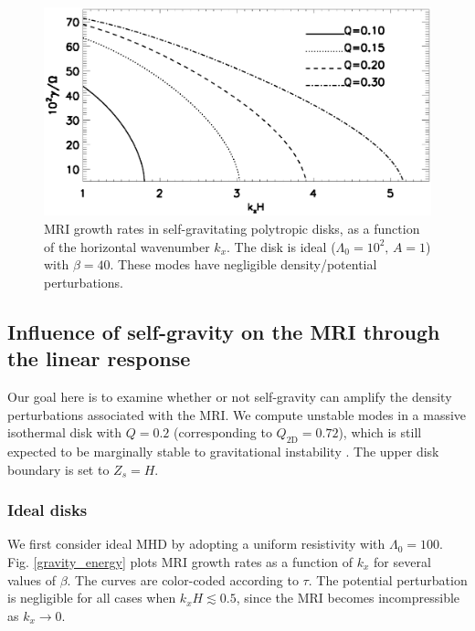  
\begin{figure}
  \includegraphics[width=\linewidth]{figures/compare_growth_poly_varQ_kx}
  \caption{MRI growth rates in self-gravitating polytropic disks, as a
    function of the horizontal wavenumber $k_x$. The disk is ideal
    ($\Lambda_0=10^2,\, A=1$) with $\beta = 40$. These modes have negligible
    density/potential perturbations.  
    \label{compare_growth_poly_kx}}
\end{figure}



\subsection{Influence of self-gravity on the MRI through the linear
  response}  
Our goal here is to examine whether or not self-gravity can amplify
the density perturbations associated with the MRI. We compute unstable modes
in a massive isothermal disk with $Q=0.2$ (corresponding to
$Q_\mathrm{2D}=0.72$), which is still expected to be marginally  
stable to gravitational instability \citep[][who find
a critical value of  $Q\simeq 0.2$]{mamat10}.   
The upper disk boundary is set to $Z_s=H$. 


\subsubsection{Ideal disks}
We first consider ideal MHD by adopting a uniform 
resistivity with $\Lambda_0=100$. %
Fig. \ref{gravity_energy} plots MRI growth rates as a function of
$k_x$ for several values of $\beta$. The curves are color-coded
according to $\tau$. The potential perturbation is
negligible for all cases when $k_xH\lesssim 0.5$, since the MRI
becomes incompressible as $k_x\to 0$. 

